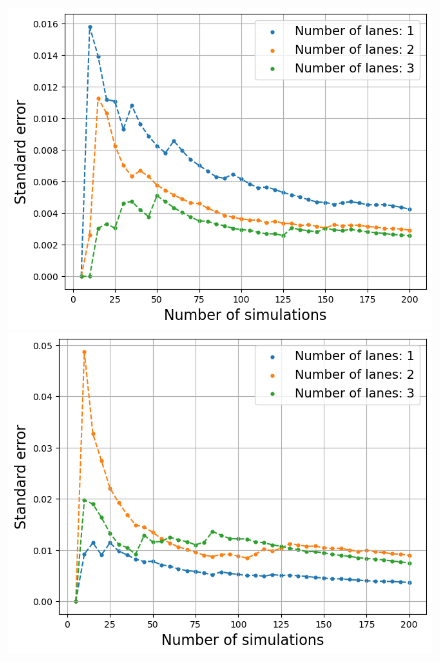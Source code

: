 \documentclass[a4paper,12pt]{article}
\begin{document}
\begin{figure}[H]
    \centering
    \begin{minipage}{.5\textwidth}
        \centering
        \includegraphics[scale=0.47]{Images/standard error 10 cars 120.png}
    \end{minipage}%
    \begin{minipage}{.5\textwidth}
        \centering
        \includegraphics[scale=0.47]{Images/standard error 30 cars 120.png}
    \end{minipage}
    \centering
    \begin{minipage}{.5\textwidth}
        \centering

\end{minipage}
\end{figure}
\end{document}
